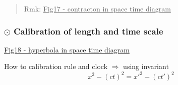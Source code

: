 \documentclass[12pt]{article}
\begin{document}
\begin{quote}
	Rmk:
\underline{Fig17 - contracton in space time diagram}
\end{quote}

\subsubsection{$\odot$ Calibration of length and time scale} %

\underline{Fig18 - hyperbola in space time diagram }

How to calibration rule and clock $\Rightarrow$ using invariant
\begin{equation}
x^2 - (ct)^2 = x'^2 - (ct')^2
\end{equation}




\end{document}
